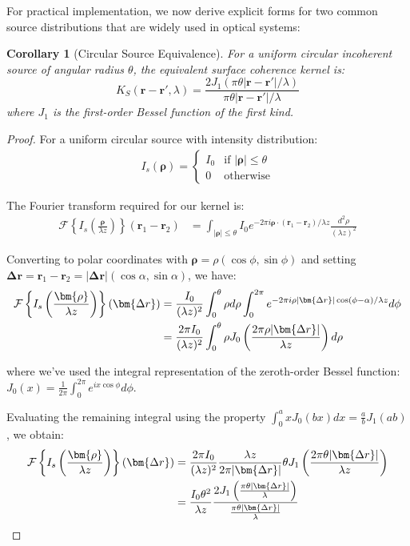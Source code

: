 \documentclass[a4paper,12pt]{article}
\newtheorem{corollary}[theorem]{Corollary}
\begin{document}
For practical implementation, we now derive explicit forms for two common source distributions that are widely used 
in optical systems:

\begin{corollary}[Circular Source Equivalence]
For a uniform circular incoherent source of angular radius $\theta$, the equivalent surface coherence kernel is:
\begin{equation}
K_S(\bm{r} - \bm{r}', \lambda) = \frac{2J_1(\pi\theta|\bm{r} - \bm{r}'|/\lambda)}{\pi\theta|\bm{r} - \bm{r}'|/\lambda}
\end{equation}
where $J_1$ is the first-order Bessel function of the first kind.
\end{corollary}

\begin{proof}
For a uniform circular source with intensity distribution:
\begin{align}
I_s(\bm{\rho}) = 
\begin{cases}
I_0 & \text{if } |\bm{\rho}| \leq \theta \\
0 & \text{otherwise}
\end{cases}
\end{align}

The Fourier transform required for our kernel is:
\begin{align}
\mathcal{F}\left\{I_s\left(\frac{\bm{\rho}}{\lambda z}\right)\right\}(\bm{r}_1 - \bm{r}_2) &= \int_{|\bm{\rho}| \leq \theta} I_0 e^{-2\pi i \bm{\rho} \cdot (\bm{r}_1 - \bm{r}_2)/\lambda z} \frac{d^2\rho}{(\lambda z)^2}
\end{align}

Converting to polar coordinates with $\bm{\rho} = \rho (\cos\phi, \sin\phi)$ and setting $\bm{\Delta r} = \bm{r}_1 - \bm{r}_2 = |\bm{\Delta r}|(\cos\alpha, \sin\alpha)$, we have:
\begin{align}
\mathcal{F}\left\{I_s\left(\frac{\bm{\rho}}{\lambda z}\right)\right\}(\bm{\Delta r}) &= \frac{I_0}{(\lambda z)^2} \int_0^{\theta} \rho d\rho \int_0^{2\pi} e^{-2\pi i \rho |\bm{\Delta r}| \cos(\phi-\alpha)/\lambda z} d\phi \\
&= \frac{2\pi I_0}{(\lambda z)^2} \int_0^{\theta} \rho J_0\left(\frac{2\pi \rho |\bm{\Delta r}|}{\lambda z}\right) d\rho \notag
\end{align}

where we've used the integral representation of the zeroth-order Bessel function: $J_0(x) = \frac{1}{2\pi}\int_0^{2\pi} e^{ix\cos\phi} d\phi$.

Evaluating the remaining integral using the property $\int_0^a x J_0(bx) dx = \frac{a}{b}J_1(ab)$, we obtain:
\begin{align}
\mathcal{F}\left\{I_s\left(\frac{\bm{\rho}}{\lambda z}\right)\right\}(\bm{\Delta r}) &= \frac{2\pi I_0}{(\lambda z)^2} \frac{\lambda z}{2\pi|\bm{\Delta r}|} \theta J_1\left(\frac{2\pi \theta |\bm{\Delta r}|}{\lambda z}\right) \\
&= \frac{I_0 \theta^2}{\lambda z} \frac{2J_1\left(\frac{\pi \theta |\bm{\Delta r}|}{\lambda}\right)}{\frac{\pi \theta |\bm{\Delta r}|}{\lambda}} \notag
\end{align}


\end{proof}
\end{document}
